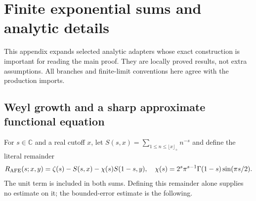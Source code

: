 \documentclass[11pt,a4paper]{article}
\numberwithin{equation}{section}
\theoremstyle{definition}
\newcommand{\C}{\mathbb C}
\begin{document}
\section{Finite exponential sums and analytic details}
\label{app:adapters}
This appendix expands selected analytic adapters whose exact construction is
important for reading the main proof. They are locally proved results, not
extra assumptions. All branches and finite-limit conventions here agree with
the production imports.

\subsection{Weyl growth and a sharp approximate functional equation}
For $s\in\C$ and a real cutoff $x$, let
$S(s,x)=\sum_{1\le n\le\lfloor x\rfloor_+}n^{-s}$ and define the literal
remainder
\[
 R_{\rm AFE}(s;x,y)=\zeta(s)-S(s,x)-\chi(s)S(1-s,y),
 \quad \chi(s)=2^s\pi^{s-1}\Gamma(1-s)\sin(\pi s/2).
\]
The unit term is included in both sums. Defining this remainder alone supplies
no estimate on it; the bounded-error estimate is the following.
\end{document}
